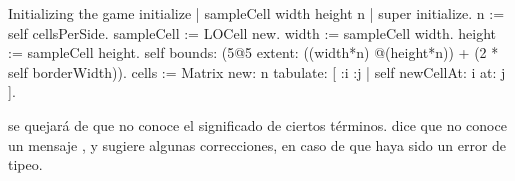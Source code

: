 \documentclass[a4paper,10pt,twoside]{book}
\begin{document}

\begin{numMethod}[sbegameinitialize]{Initializing the game}
initialize
   | sampleCell width height n |
   super initialize.
   n := self cellsPerSide.
   sampleCell := LOCell new.
   width := sampleCell width.
   height := sampleCell height.
   self bounds: (5@5 extent: ((width*n) @(height*n)) + (2 * self borderWidth)).
   cells := Matrix new: n tabulate: [ :i :j | self newCellAt: i at: j ].
\end{numMethod}



\pharo se quejar\'a de que no conoce el significado de ciertos t\'erminos.
\pharo dice que no conoce un mensaje , y sugiere algunas correcciones, en caso de que haya sido un error de tipeo.
\end{document}
